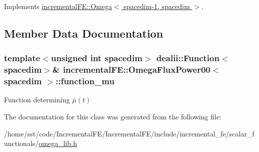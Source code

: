Implements \hyperlink{classincremental_f_e_1_1_omega_a2f35d862aefa11151de5b7c7411e45df}{incremental\+F\+E\+::\+Omega$<$ spacedim-\/1, spacedim $>$}.



\subsection{Member Data Documentation}
\subsubsection[{\texorpdfstring{function\+\_\+mu}{function_mu}}]{\setlength{\rightskip}{0pt plus 5cm}template$<$unsigned int spacedim$>$ dealii\+::\+Function$<$spacedim$>$\& {\bf incremental\+F\+E\+::\+Omega\+Flux\+Power00}$<$ spacedim $>$\+::function\+\_\+mu\hspace{0.3cm}{\ttfamily [private]}}\hypertarget{classincremental_f_e_1_1_omega_flux_power00_a9b8beb230f2a0609646ddebe08c1c236}{}\label{classincremental_f_e_1_1_omega_flux_power00_a9b8beb230f2a0609646ddebe08c1c236}
Function determining $\bar \mu(t)$ 

The documentation for this class was generated from the following file\+:\begin{DoxyCompactItemize}
\item 
/home/sst/code/\+Incremental\+F\+E/\+Incremental\+F\+E/include/incremental\+\_\+fe/scalar\+\_\+functionals/\hyperlink{omega__lib_8h}{omega\+\_\+lib.\+h}\end{DoxyCompactItemize}
